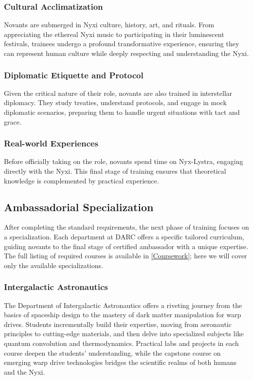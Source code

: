 \subsubsection{Cultural Acclimatization}
Novants are submerged in Nyxi culture, history, art, and rituals. From
appreciating the ethereal Nyxi music to participating in their luminescent
festivals, trainees undergo a profound transformative experience, ensuring they
can represent human culture while deeply respecting and understanding the Nyxi.

\subsubsection{Diplomatic Etiquette and Protocol}
Given the critical nature of their role, novants are also trained in
interstellar diplomacy. They study treaties, understand protocols, and engage
in mock diplomatic scenarios, preparing them to handle urgent situations with
tact and grace.

\subsubsection{Real-world Experiences}
Before officially taking on the role, novants spend time on Nyx-Lystra,
engaging directly with the Nyxi. This final stage of training ensures that
theoretical knowledge is complemented by practical experience.

\subsection{Ambassadorial Specialization}
After completing the standard requirements, the next phase of training focuses
on a specialization. Each department at DARC offers a specific tailored
curriculum, guiding novants to the final stage of certified ambassador with a
unique expertise. The full listing of required courses is available in
\ref{Coursework}; here we will cover only the available specializations.

\begin{center}
\end{center}

\subsubsection{Intergalactic Astronautics}
The Department of Intergalactic Astronautics offers a riveting journey from the
basics of spaceship design to the mastery of dark matter manipulation for warp
drives. Students incrementally build their expertise, moving from aeronautic
principles to cutting-edge materials, and then delve into specialized subjects
like quantum convolution and thermodynamics. Practical labs and projects in
each course deepen the students' understanding, while the capstone course on
emerging warp drive technologies bridges the scientific realms of both humans
and the Nyxi.

